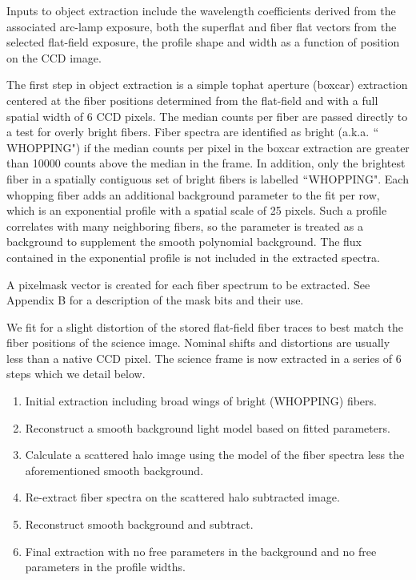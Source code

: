 \documentclass[12pt,preprint]{aastex}
\begin{document}
Inputs to object extraction include the wavelength coefficients derived
from the associated arc-lamp exposure, both the superflat and fiber flat
vectors from the selected flat-field exposure, the profile shape and width
as a function of position on the CCD image.

The first step in object extraction is a simple tophat aperture (boxcar) 
extraction centered at the fiber positions determined from the flat-field 
and with a full spatial width of 6 CCD pixels.  The median counts per fiber 
are passed directly to a test for overly bright fibers. Fiber spectra are 
identified as bright (a.k.a. $``$WHOPPING") 
if the median counts per pixel in the 
boxcar extraction are greater than 10000 counts above the median in the 
frame.  In addition, only the brightest fiber in a spatially contiguous set of 
bright fibers is labelled $``$WHOPPING".  Each whopping fiber adds an additional
background parameter to the fit per row, which is an exponential profile
with a spatial scale of 25 pixels.  Such a profile correlates with many
neighboring fibers, so the parameter is treated as a background to supplement
the smooth polynomial background.  The flux contained in the exponential 
profile is not included in the extracted spectra.

A pixelmask vector is created for each fiber spectrum to be extracted.
See Appendix B for a description of the mask bits and their use.

We fit for a slight distortion of the stored flat-field fiber traces to 
best match the fiber positions of the science image.  Nominal shifts and
distortions are usually less than a native CCD pixel.  The science frame
is now extracted in a series of 6 steps which we detail below.

\begin{enumerate}
\item{Initial extraction including broad wings of bright (WHOPPING) fibers.}
\item{Reconstruct a smooth background light model based on fitted parameters.}
\item{Calculate a scattered halo image using the model of the fiber spectra less
the aforementioned smooth background.}
\item{Re-extract fiber spectra on the scattered halo subtracted image.}
\item{Reconstruct smooth background and subtract.}
\item{Final extraction with no free parameters in the background and
no free parameters in the profile widths.}
\end{enumerate}
\end{document}
